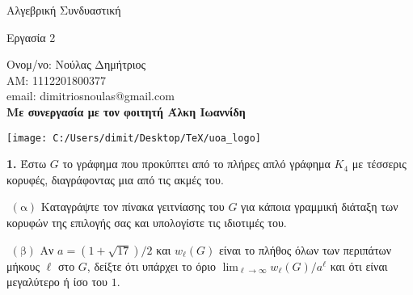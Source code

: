 \documentclass[oneside,a4paper]{article}
\newcommand {\tl}{\textlatin}
\begin{document}
	
	
	\begin{framed}	
		\begin{center}
			\huge Αλγεβρική Συνδυαστική
		\end{center}
		\begin{center}
			\huge Εργασία 2
		\end{center}
		\vspace{0.3truecm}
		\begin{center}
			Ονομ/νο: Νούλας Δημήτριος\\
			ΑΜ: 1112201800377\\
			\tl{email}: \tl{dimitriosnoulas@gmail.com} \\
			\vspace{0.1cm}
			\textbf{Με συνεργασία με τον φοιτητή Άλκη Ιωαννίδη}
		\end{center}
		\vspace{0.3truecm}
	\end{framed}
	\vspace*{\fill}
	\begin{center}
	\texttt{[image: C:/Users/dimit/Desktop/TeX/uoa\_logo]}
	\end{center}
\vspace{1cm}
\pagebreak

\noindent \textbf{1.} Έστω $G$ το γράφημα που προκύπτει από το πλήρες απλό γράφημα $K_4$ με τέσσερις κορυφές, διαγράφοντας μια από τις ακμές του.

$ $\newline
$(\text{α})$ Καταγράψτε τον πίνακα γειτνίασης του $G$ για κάποια γραμμική διάταξη των κορυφών της επιλογής σας και υπολογίστε τις ιδιοτιμές του.

$ $\newline
$(\text{β})$ Αν $a = (1+\sqrt{17})/2$ και $w_{\ell}(G)$ είναι το πλήθος όλων των περιπάτων μήκους $\ell$ στο $G$, δείξτε ότι υπάρχει το όριο $\lim_{\ell \rightarrow \infty } w_{\ell}(G)/a^{\ell}$ και ότι είναι μεγαλύτερο ή ίσο του $1$.
\end{document}
